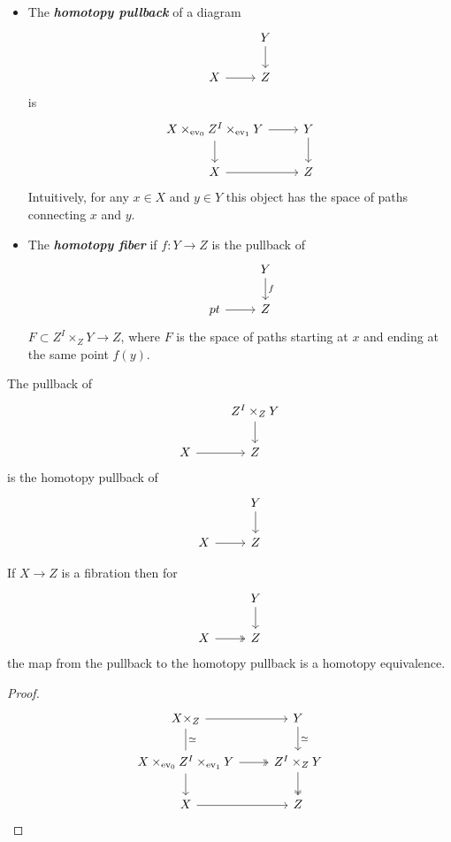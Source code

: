 \documentclass{article}
\DeclareMathOperator{\ev}{ev}
\begin{document}
\begin{defn}\leavevmode
	\begin{itemize}
		\item The \textbf{\textit{homotopy pullback}} of a diagram
		\[\begin{tikzcd}
			&Y\arrow[d]\\
			X\arrow[r]&Z
		\end{tikzcd}\]
		is
		\[\begin{tikzcd}
			X\times_{\ev_0}Z^I\times_{\ev_1}Y\arrow[d]\arrow[r]&Y\arrow[d]\\
			X\arrow[r]&Z
		\end{tikzcd}\]
		Intuitively, for any $x\in X$ and $y\in Y$ this object has the space of paths connecting $x$ and $y$.
		
		\item The \textbf{\textit{homotopy fiber}} if $f:Y\to Z$ is the pullback of
		\[\begin{tikzcd}
			&Y\arrow[d,"f"]\\
			pt\arrow[r]&Z
		\end{tikzcd}\]
		$F\subset Z^I\times_ZY\to Z$, where $F$ is the space of paths starting at $x$ and ending at the same point $f(y)$.
	\end{itemize}
\end{defn}
\begin{remark}
	The pullback of
	\[\begin{tikzcd}
		&Z^I\times_ZY\arrow[d]\\
		X\arrow[r]&Z
	\end{tikzcd}\]
	is the homotopy pullback of
	\[\begin{tikzcd}
		&Y\arrow[d]\\
		X\arrow[r]&Z
	\end{tikzcd}\]
\end{remark}
\begin{lemma}
	If $X\to Z$ is a fibration then for
	\[\begin{tikzcd}
		&Y\arrow[d]\\
		X\arrow[r,two heads]&Z
	\end{tikzcd}\]
	the map from the pullback to the homotopy pullback is a homotopy equivalence.
\end{lemma}
\begin{proof}
	\[\begin{tikzcd}
		X\times_Z\arrow[r]\arrow[d,"\simeq",dash]&Y\arrow[d,"\simeq"]\\
		X\times_{\ev_0}Z^I\times_{\ev_1}Y\arrow[r,two heads]\arrow[d]&Z^I\times_ZY\arrow[d,two heads]\\
		X\arrow[r]&Z
	\end{tikzcd}\]
\end{proof}
\end{document}
